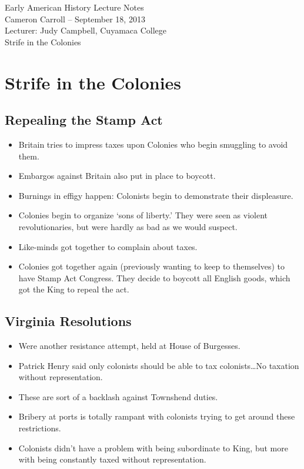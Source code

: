 \documentclass{article}
\begin{document}
  \begin{center}
    {\small{} Early American History Lecture Notes} \\[0.6cm]
    {\small{} Cameron Carroll -- September 18, 2013} \\[0.6cm]
    {\small{} Lecturer: Judy Campbell, Cuyamaca College}\\[1cm]
    {\small{} Strife in the Colonies}\\[1cm]
  \end{center}
  
  \tableofcontents
  \newpage

  \section{Strife in the Colonies}
    \subsection{Repealing the Stamp Act}
      \begin{itemize}
        \item Britain tries to impress taxes upon Colonies who begin smuggling to avoid them.
        \item Embargos against Britain also put in place to boycott.
        \item Burnings in effigy happen: Colonists begin to demonstrate their displeasure.
        \item Colonies begin to organize `sons of liberty.' They were seen as violent revolutionaries, but were hardly as bad as we would suspect.
        \item Like-minds got together to complain about taxes.
        \item Colonies got together again (previously wanting to keep to themselves) to have Stamp Act Congress. They decide to boycott all English goods, which got the King to repeal the act.
      \end{itemize}

    \subsection{Virginia Resolutions}
      \begin{itemize}
        \item Were another resistance attempt, held at House of Burgesses.
        \item Patrick Henry said only colonists should be able to tax colonists\ldots No taxation without representation.
        \item These are sort of a backlash against Townshend duties.
        \item Bribery at ports is totally rampant with colonists trying to get around these restrictions.
        \item Colonists didn't have a problem with being subordinate to King, but more with being constantly taxed without representation.
      \end{itemize}
\end{document}
